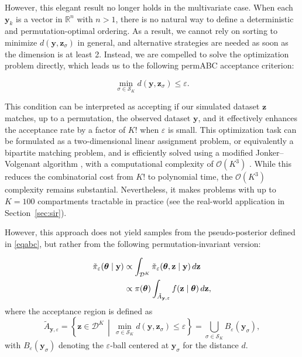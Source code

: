 \documentclass[lineno]{biometrika}
\def\dataspace{\mathcal{D}}
\def\obsdata{\mathbf{y}}
\def\param{\boldsymbol{\theta}}
\def\simdata{\mathbf{z}}
\begin{document}
However, this elegant result no longer holds in the multivariate case. When each $\obsdata_k$ is a vector in $\mathbb{R}^n$ with $n > 1$, there is no natural way to define a deterministic and permutation-optimal ordering. As a result, we cannot rely on sorting to minimize $d(\obsdata, \simdata_{\sigma})$ in general, and alternative strategies are needed as soon as the dimension is at least 2. Instead, we are compelled to solve the optimization problem directly, which leads us to the following permABC acceptance criterion:

\begin{equation}
    \label{eqopti}
    \min_{\sigma \in \mathcal{S}_K} d(\obsdata, \simdata_{\sigma}) \leq \varepsilon.
\end{equation}

This condition can be interpreted as accepting if our simulated dataset $\simdata$ matches, up to a permutation, the observed dataset $\obsdata$, and it effectively enhances the acceptance rate by a factor of $K!$ when $\varepsilon$ is small. This optimization task can be formulated as a two-dimensional linear assignment problem, or equivalently a bipartite matching problem, and is efficiently solved using a modified Jonker–Volgenant algorithm \citep{jonker1987shortest}, with a computational complexity of $\mathcal{O}(K^3)$ \citep{crouseImplementing2DRectangular2016a}.
While this reduces the combinatorial cost from $K!$ to polynomial time, the $\mathcal{O}(K^3)$ complexity remains substantial. Nevertheless, it makes problems with up to $K = 100$ compartments tractable in practice (see the real-world application in Section~\ref{sec:sir}).


However, this approach does not yield samples from the pseudo-posterior defined in \eqref{eqabc}, but rather from the following permutation-invariant version:

\begin{equation} 
    \label{eqpermabc_tilde}
    \begin{split}
        \Tilde \pi_{\varepsilon} (\param \mid \obsdata)  & \propto \int_{\dataspace^K} \Tilde \pi_{\varepsilon} (\param , \simdata \mid \obsdata) \, d\simdata \\
        & \propto \pi(\param) \int_{\Tilde A_{\obsdata,\varepsilon}} f(\simdata \mid \param) \, d\simdata,
    \end{split}
\end{equation}
where the acceptance region is defined as
\[
\tilde{A}_{\obsdata,\varepsilon} = \left\{\simdata \in \dataspace^K \,\middle|\, \min_{\sigma \in \mathcal{S}_K} d(\obsdata, \simdata_{\sigma}) \leq \varepsilon \right\} = \bigcup_{\sigma \in \mathcal{S}_K} B_{\varepsilon}(\obsdata_{\sigma}),
\]
with \( B_{\varepsilon}(\obsdata_{\sigma}) \) denoting the \( \varepsilon \)-ball centered at \( \obsdata_{\sigma} \) for the distance \( d \).
\end{document}
